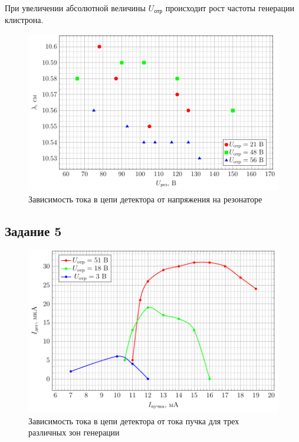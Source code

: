 При увеличении абсолютной величины $U_{\text{отр}}$ происходит рост частоты генерации клистрона. 

\begin{figure}[h]
		\centering
		\includegraphics[scale=1]{plots/task4b}
		\caption{Зависимость тока в цепи детектора от напряжения на резонаторе}
		\label{fig:task4b}
\end{figure}

\subsection{Задание 5}
\begin{figure}[H]
		\centering
		\includegraphics[height=0.4\textheight]{plots/task5}
		\caption{Зависимость тока в цепи детектора от тока пучка для трех различных зон генерации}
		\label{fig:task5}
\end{figure}
